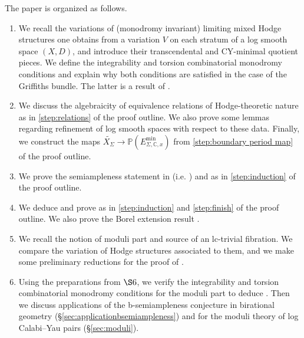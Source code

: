 \documentclass{amsart}
\theoremstyle{definition}
\theoremstyle{remark}
\def\bC{\mathbb{C}}
\def\bP{\mathbb{P}}
\def\mini{\mathrm{min}}
\numberwithin{equation}{section}
\begin{document}
The paper is organized as follows.
\begin{enumerate}
\item[($\S2$)]  We recall the variations of (monodromy invariant) limiting mixed Hodge structures one obtains from a variation $V$ on each stratum of a log smooth space $(X,D)$, and introduce their transcendental and CY-minimal quotient pieces.  We define the integrability and torsion combinatorial monodromy conditions and explain why both conditions are satisfied in the case of the Griffiths bundle.  The latter is a result of \cite{GGRtorsion}. 
\item[($\S3$)]  We discuss the algebraicity of equivalence relations of Hodge-theoretic nature as in \eqref{step:relations} of the proof outline.  We also prove some lemmas regarding refinement of log smooth spaces with respect to these data.  Finally, we construct the maps $\widetilde{X_\Sigma}\to\bP(E_{\Sigma,\bC,x}^\mini)$ from \eqref{step:boundary period map} of the proof outline.
\item[($\S4$)] We prove the semiampleness statement in  (i.e. ) and  as in \eqref{step:induction} of the proof outline.
\item[($\S5$)]  We deduce  and prove  as in \eqref{step:induction} and \eqref{step:finish} of the proof outline.  We also prove the Borel extension result .
\item[($\S 6$)]  We recall the notion of moduli part and source of an lc-trivial fibration. We compare the variation of Hodge structures associated to them, and we make some preliminary reductions for the proof of .
\item[($\S 7$)] Using the preparations from $\S6$, we verify the integrability and torsion combinatorial monodromy conditions for the moduli part to deduce . Then we discuss applications of the  b-semiampleness conjecture in birational geometry (\S \ref{sec:applicationbsemiampleness}) and for the moduli theory of log Calabi--Yau pairs (\S\ref{sec:moduli}).
\end{enumerate}
\end{document}
